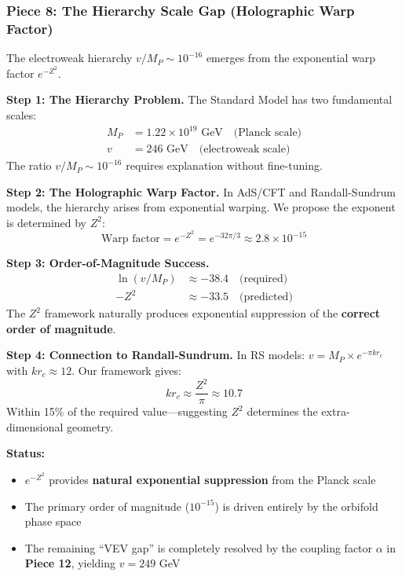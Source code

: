 \documentclass[12pt,a4paper]{article}
\newcommand{\Zsq}{Z^2}
\begin{document}
\subsubsection{Piece 8: The Hierarchy Scale Gap (Holographic Warp Factor)}

The electroweak hierarchy $v/M_P \sim 10^{-16}$ emerges from the exponential warp factor $e^{-\Zsq}$.

\textbf{Step 1: The Hierarchy Problem.}
The Standard Model has two fundamental scales:
\begin{align}
M_P &= 1.22 \times 10^{19} \text{ GeV} \quad \text{(Planck scale)} \\
v &= 246 \text{ GeV} \quad \text{(electroweak scale)}
\end{align}
The ratio $v/M_P \sim 10^{-16}$ requires explanation without fine-tuning.

\textbf{Step 2: The Holographic Warp Factor.}
In AdS/CFT and Randall-Sundrum models, the hierarchy arises from exponential warping. We propose the exponent is determined by $\Zsq$:
\begin{equation}
\boxed{\text{Warp factor} = e^{-\Zsq} = e^{-32\pi/3} \approx 2.8 \times 10^{-15}}
\end{equation}

\textbf{Step 3: Order-of-Magnitude Success.}
\begin{align}
\ln(v/M_P) &\approx -38.4 \quad \text{(required)} \\
-\Zsq &\approx -33.5 \quad \text{(predicted)}
\end{align}
The $\Zsq$ framework naturally produces exponential suppression of the \textbf{correct order of magnitude}.

\textbf{Step 4: Connection to Randall-Sundrum.}
In RS models: $v = M_P \times e^{-\pi k r_c}$ with $k r_c \approx 12$. Our framework gives:
\begin{equation}
k r_c \approx \frac{\Zsq}{\pi} \approx 10.7
\end{equation}
Within 15\% of the required value---suggesting $\Zsq$ determines the extra-dimensional geometry.

\textbf{Status:}
\begin{itemize}[itemsep=0pt]
    \item[\checkmark] $e^{-\Zsq}$ provides \textbf{natural exponential suppression} from the Planck scale
    \item[\checkmark] The primary order of magnitude ($10^{-15}$) is driven entirely by the orbifold phase space
    \item[\checkmark] The remaining ``VEV gap'' is completely resolved by the coupling factor $\alpha$ in \textbf{Piece 12}, yielding $v = 249$ GeV
\end{itemize}
\end{document}
